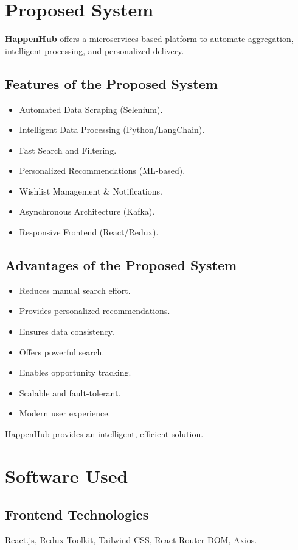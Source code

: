 \documentclass[12pt, a4paper]{report}
\begin{document}
\section{Proposed System}
\textbf{HappenHub} offers a microservices-based platform to automate aggregation, intelligent processing, and personalized delivery.

\subsection{Features of the Proposed System}
\begin{itemize}
    \item Automated Data Scraping (Selenium).
    \item Intelligent Data Processing (Python/LangChain).
    \item Fast Search and Filtering.
    \item Personalized Recommendations (ML-based).
    \item Wishlist Management & Notifications.
    \item Asynchronous Architecture (Kafka).
    \item Responsive Frontend (React/Redux).
\end{itemize}

\subsection{Advantages of the Proposed System}
\begin{itemize}
    \item Reduces manual search effort.
    \item Provides personalized recommendations.
    \item Ensures data consistency.
    \item Offers powerful search.
    \item Enables opportunity tracking.
    \item Scalable and fault-tolerant.
    \item Modern user experience.
\end{itemize}
HappenHub provides an intelligent, efficient solution.

\section{Software Used}
\subsection{Frontend Technologies}
React.js, Redux Toolkit, Tailwind CSS, React Router DOM, Axios.
\end{document}
